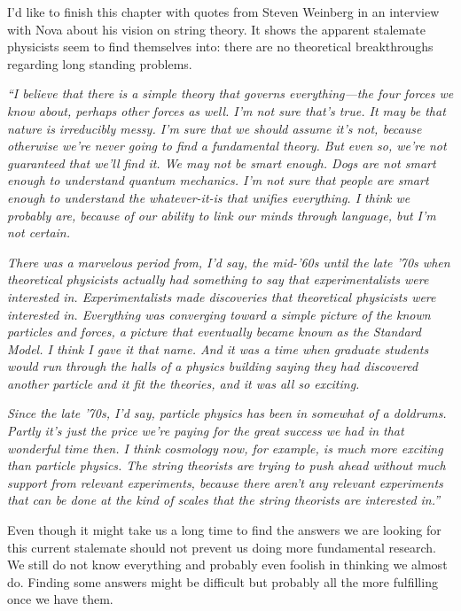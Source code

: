 \noindent I'd like to finish this chapter with quotes from Steven Weinberg in an interview with Nova about his vision on string theory. It shows the apparent stalemate physicists seem to find themselves into: there are no theoretical breakthroughs regarding long standing problems.

\begin{center}
\begin{minipage}[5cm]{0.9\textwidth}
\textit{``I believe that there is a simple theory that governs everything—the four forces we know about, perhaps other forces as well. I'm not sure that's true. It may be that nature is irreducibly messy. I'm sure that we should assume it's not, because otherwise we're never going to find a fundamental theory. But even so, we're not guaranteed that we'll find it. We may not be smart enough. Dogs are not smart enough to understand quantum mechanics. I'm not sure that people are smart enough to understand the whatever-it-is that unifies everything. I think we probably are, because of our ability to link our minds through language, but I'm not certain.}
 
\hspace{3mm} \textit{There was a marvelous period from, I'd say, the mid-'60s until the late '70s when theoretical physicists actually had something to say that experimentalists were interested in. Experimentalists made discoveries that theoretical physicists were interested in. Everything was converging toward a simple picture of the known particles and forces, a picture that eventually became known as the Standard Model. I think I gave it that name. And it was a time when graduate students would run through the halls of a physics building saying they had discovered another particle and it fit the theories, and it was all so exciting.} 

\hspace{3mm}\textit{Since the late '70s, I'd say, particle physics has been in somewhat of a doldrums. Partly it's just the price we're paying for the great success we had in that wonderful time then. I think cosmology now, for example, is much more exciting than particle physics. The string theorists are trying to push ahead without much support from relevant experiments, because there aren't any relevant experiments that can be done at the kind of scales that the string theorists are interested in.''}
\end{minipage} 
\end{center}

Even though it might take us a long time to find the answers we are looking for this current stalemate should not prevent us doing more fundamental research. We still do not know everything and probably even foolish in thinking we almost do. Finding some answers might be difficult but probably all the more fulfilling once we have them.